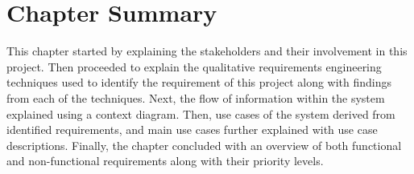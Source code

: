 \section{Chapter Summary}
This chapter started by explaining the stakeholders and their involvement in this project. Then proceeded to explain the qualitative requirements engineering techniques used to identify the requirement of this project along with findings from each of the techniques. Next, the flow of information within the system explained using a context diagram. Then, use cases of the system derived from identified requirements, and main use cases further explained with use case descriptions. Finally, the chapter concluded with an overview of both functional and non-functional requirements along with their priority levels.